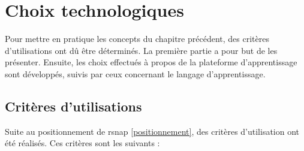 \section{Choix technologiques}
\label{techno}
Pour mettre en pratique les concepts du chapitre précédent, des critères d'utilisations ont dû être déterminés. La première partie a pour but de les présenter. Ensuite, les choix effectués à propos de la plateforme d'apprentissage sont développés, suivis par ceux concernant le langage d'apprentissage.

\subsection{Critères d'utilisations}
Suite au positionnement de \gls{rsnap} \ref{positionnement}, des critères d'utilisation ont été réalisés. Ces critères sont les suivants :

